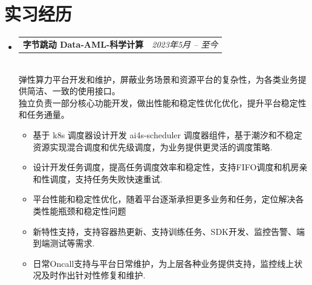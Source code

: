 \documentclass[letterpaper,11pt]{article}
\makeatletter
\newcommand{\resumeItem}[2]{
  \item\small{
    \textbf{#1}{ #2 \vspace{-2pt}}
  }
}
\newcommand{\resumeSubheadingtwo}[2]{
  \vspace{-1pt}\item
    \begin{tabular*}{0.97\textwidth}{l@{\extracolsep{\fill}}r}
      \textbf{#1} & \textit{ #2} \\
    \end{tabular*}\vspace{-5pt}
}
\newcommand{\resumeItemListStart}{\vspace{-10pt}\begin{itemize}}
\newcommand{\resumeItemListEnd}{\end{itemize}\vspace{-10pt}}
\makeatother
\begin{document}
\section{实习经历}
    \begin{itemize}[leftmargin=*,itemsep=-10pt]
        \resumeSubheadingtwo
            {字节跳动 Data-AML-科学计算}{2023年5月 -- 至今}
            \\[10pt]
            弹性算力平台开发和维护，屏蔽业务场景和资源平台的复杂性，为各类业务提供简洁、一致的使用接口。\\
            独立负责一部分核心功能开发，做出性能和稳定性优化优化，提升平台稳定性和任务通量。
            \resumeItemListStart
                 \resumeItem{}
                {基于 k8s 调度器设计开发 ai4s-scheduler 调度器组件，基于潮汐和不稳定资源实现混合调度和优先级调度，为业务提供更灵活的调度策略.}
                \resumeItem{}
                {设计开发任务调度，提高任务调度效率和稳定性，支持FIFO调度和机房亲和性调度，支持任务失败快速重试.}
                \resumeItem{}
                {平台性能和稳定性优化，随着平台逐渐承担更多业务和任务，定位解决各类性能瓶颈和稳定性问题}
                \resumeItem{}
                {新特性支持，支持容器热更新、支持训练任务、SDK开发、监控告警、端到端测试等需求.}
                \resumeItem{}
                {日常Oncall支持与平台日常维护，为上层各种业务提供支持，监控线上状况及时作出针对性修复和维护.}
            \resumeItemListEnd
    \end{itemize}

\vspace{-10pt}
\end{document}
